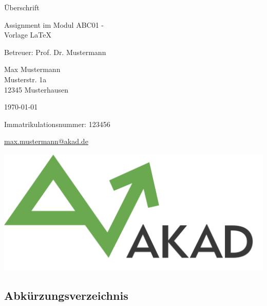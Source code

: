 \documentclass[a4paper,12pt]{article}
\begin{document}
\begin{center}
\thispagestyle{empty}
\vspace{9cm}

\Huge{Überschrift}
\vspace{1cm}
\onehalfspacing

\Large{Assignment im Modul ABC01 - \\ Vorlage \LaTeX{}}

\vspace{1cm}
\Large{Betreuer: Prof. Dr. Mustermann \\}
\normalsize
\vspace{2cm}

Max Mustermann\\Musterstr. 1a\\12345 Musterhausen
\\
\vspace{2cm}

\today

Immatrikulationsnummer: 123456

\href{mailto:max.mustermann@akad.de}{max.mustermann@akad.de}
\vspace{3cm}

\includegraphics[scale=0.35]{akad_logo.png}

\end{center}

\clearpage

\normalsize


\begin{spacing}{1.0} %
\newpage
\tableofcontents %
\newpage
\listoffigures %
\newpage
\listoftables %
\newpage
\section*{Abkürzungsverzeichnis}
\begin{acronym}[ABK]
\end{acronym}
\end{spacing} 
\end{document}
